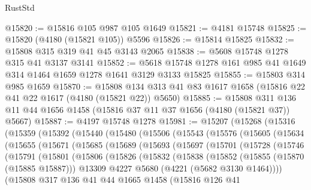 \begin{lexlean}{RustStd}
\begin{coremodule}
{\begin{coremodule}
{{{{{{{{{{{{{{{{{{{{{{{{{{{{{{{@15820 := @15816 @105 @987 @105 @1649
@15821 := @4181 @15748
@15825 := @15820 (@4180 (@15821 @105)) @5596
@15826 := @15814 @15825
@15832 := @15808 @315 @319 @41 @45 @3143 @2065
@15838 := @5608 @15748 @1278 @315 @41 @3137 @3141
@15852 := @5618 @15748 @1278 @161 @985 @41 @1649 @314 @1464 @1659 @1278 @1641 @3129 @3133 @15825
@15855 := @15803 @314 @985 @1659
@15870 := @15808 @134 @313 @41 @83 @1617 @1658 (@15816 @22 @41 @22 @1617 (@4180 (@15821 @22)) @5650)
@15885 := @15808 @311 @136 @11 @44 @1656 @1458 (@15816 @37 @11 @37 @1656 (@4180 (@15821 @37)) @5667)
@15887 := @4197 @15748 @1278
@15981 := @15207
    (@15268
      (@15316
        (@15359
          (@15392
            (@15440
              (@15480
                (@15506
                  (@15543
                    (@15576
                      (@15605
                        (@15634
                          (@15655
                            (@15671
                              (@15685
                                (@15689
                                  (@15693
                                    (@15697
                                      (@15701
                                        (@15728
                                          (@15746
                                            (@15791
                                              (@15801
                                                (@15806
                                                  (@15826
                                                    (@15832
                                                      (@15838
                                                        (@15852
                                                          (@15855 (@15870 (@15885 @15887)))
                                                          @13309
                                                          @4227
                                                          @5680
                                                          (@4221 (@5682 @3130 @1464))))
                                                      (@15808
                                                        @317
                                                        @136
                                                        @41
                                                        @44
                                                        @1665
                                                        @1458
                                                        (@15816
                                                          @126
                                                          @41
}}}}}}}}}}}}}}}}}}}}}}}}}}}}}}}
\end{coremodule}}
\end{coremodule}
\end{lexlean}
